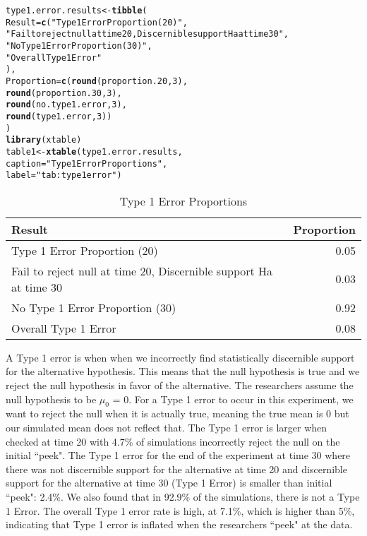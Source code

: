 \documentclass{article}\usepackage[]{graphicx}\usepackage[]{xcolor}
\makeatletter
\newcommand{\hlnum}[1]{\textcolor[rgb]{0.686,0.059,0.569}{#1}}%
\newcommand{\hlsng}[1]{\textcolor[rgb]{0.192,0.494,0.8}{#1}}%
\newcommand{\hldef}[1]{\textcolor[rgb]{0.345,0.345,0.345}{#1}}%
\newcommand{\hlkwb}[1]{\textcolor[rgb]{0.69,0.353,0.396}{#1}}%
\newcommand{\hlkwc}[1]{\textcolor[rgb]{0.333,0.667,0.333}{#1}}%
\newcommand{\hlkwd}[1]{\textcolor[rgb]{0.737,0.353,0.396}{\textbf{#1}}}%
\newenvironment{kframe}{%
 \def\at@end@of@kframe{}%
 \ifinner\ifhmode%
  \def\at@end@of@kframe{\end{minipage}}%
  \begin{minipage}{\columnwidth}%
 \fi\fi%
 \def\FrameCommand##1{\hskip\@totalleftmargin \hskip-\fboxsep
 \colorbox{shadecolor}{##1}\hskip-\fboxsep
     \hskip-\linewidth \hskip-\@totalleftmargin \hskip\columnwidth}%
 \MakeFramed {\advance\hsize-\width
   \@totalleftmargin\z@ \linewidth\hsize
   \@setminipage}}%
 {\par\unskip\endMakeFramed%
 \at@end@of@kframe}
\newenvironment{knitrout}{}{} %
\makeatother
\begin{document}
\begin{enumerate}
\begin{enumerate}
\begin{knitrout}
\begin{kframe}
\begin{alltt}
\hldef{type1.error.results} \hlkwb{<-} \hlkwd{tibble}\hldef{(}
  \hlkwc{Result} \hldef{=} \hlkwd{c}\hldef{(}\hlsng{"Type 1 Error Proportion (20)"}\hldef{,}
             \hlsng{"Fail to reject null at time 20, Discernible support Ha at time 30"}\hldef{,}
             \hlsng{"No Type 1 Error Proportion (30)"}\hldef{,}
             \hlsng{"Overall Type 1 Error"}
             \hldef{),}
  \hlkwc{Proportion} \hldef{=} \hlkwd{c}\hldef{(}\hlkwd{round}\hldef{(proportion.20,}\hlnum{3}\hldef{),}
                 \hlkwd{round}\hldef{(proportion.30,}\hlnum{3}\hldef{),}
                 \hlkwd{round}\hldef{(no.type1.error,}\hlnum{3}\hldef{),}
                 \hlkwd{round}\hldef{(type1.error,}\hlnum{3}\hldef{))}
\hldef{)}
\hlkwd{library}\hldef{(xtable)}
\hldef{table1} \hlkwb{<-} \hlkwd{xtable}\hldef{(type1.error.results,}
                 \hlkwc{caption} \hldef{=} \hlsng{"Type 1 Error Proportions"}\hldef{,}
                 \hlkwc{label} \hldef{=} \hlsng{"tab:type1error"}\hldef{)}
\end{alltt}
\end{kframe}
\end{knitrout}
\begin{table}[H]
\centering
\begingroup\small
\begin{tabular}{lr}
  \hline
Result & Proportion \\ 
  \hline
Type 1 Error Proportion (20) & 0.05 \\ 
  Fail to reject null at time 20, Discernible support Ha at time 30 & 0.03 \\ 
  No Type 1 Error Proportion (30) & 0.92 \\ 
  Overall Type 1 Error & 0.08 \\ 
   \hline
\end{tabular}
\endgroup
\caption{Type 1 Error Proportions} 
\label{tab:type1error}
\end{table}

A Type 1 error is when when we incorrectly find statistically discernible support for the alternative hypothesis. This means that the null hypothesis is true and we reject the null hypothesis in favor of the alternative. The researchers assume the null hypothesis to be $\mu_{0}$ = 0. For a Type 1 error to occur in this experiment, we want to reject the null when it is actually true, meaning the true mean is 0 but our simulated mean does not reflect that. The Type 1 error is larger when checked at time 20 with 4.7\% of simulations incorrectly reject the null on the initial ``peek". The Type 1 error for the end of the experiment at time 30 where there was not discernible support for the alternative at time 20 and discernible support for the alternative at time 30 (Type 1 Error) is smaller than initial ``peek": 2.4\%.
We also found that in 92.9\% of the simulations, there is not a Type 1 Error. The overall Type 1 error rate is high, at 7.1\%, which is higher than 5\%, indicating that Type 1 error is inflated when the researchers ``peek" at the data.


\end{enumerate}
\end{enumerate}
\end{document}
